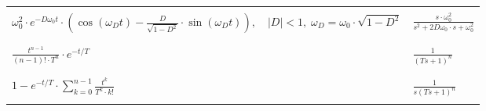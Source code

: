 \begin{tabularx}{\textwidth}{|p{13.5cm}|X|}
	&\\
	\hline
	&\\
	\(\omega_0^2\cdot e^{-D\omega_0 t}\cdot\left(\cos\left(\omega_D t\right)-\frac{D}{\sqrt{1-D^2}}\cdot\sin\left(\omega_D t\right)\right),\quad |D|<1,\;\omega_D=\omega_0\cdot\sqrt{1-D^2}\) & \(\frac{s\cdot\omega_0^2}{s^2+2D\omega_0\cdot s+\omega_0^2}\) \\
	&\\
	\hline
	&\\
	\(\frac{t^{n-1}}{(n-1)!\cdot T^n}\cdot e^{-t/T}\) & \(\frac{1}{(Ts+1)^n}\) \\
	&\\
	\hline
	&\\
	\(1- e^{-t/T}\cdot\sum_{k=0}^{n-1}\frac{t^k}{T^k\cdot k!}\) & \(\frac{1}{s(Ts+1)^n}\) \\
	&\\
	\hline
\end{tabularx}
\newpage

